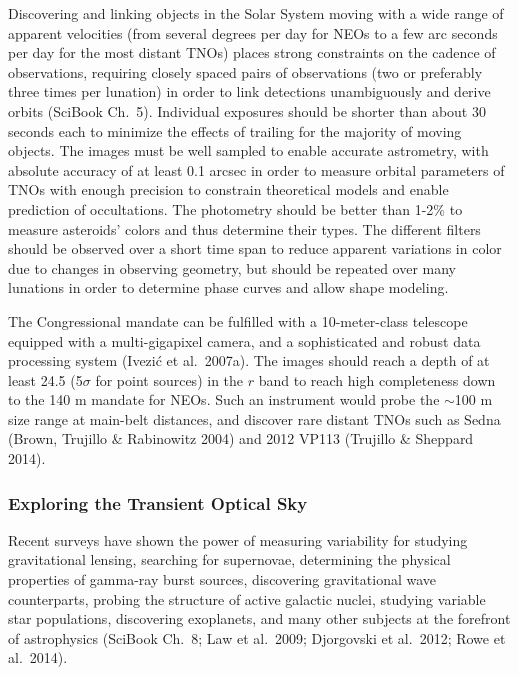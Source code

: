 Discovering and linking objects in the Solar System moving with a wide range of apparent velocities (from
several degrees per day for NEOs to a few arc seconds per day for the most distant TNOs) places strong
constraints on the cadence of observations, requiring closely spaced pairs of observations (two or preferably
three times per lunation) in order to link detections unambiguously and derive orbits (SciBook Ch.~5). Individual
exposures should be shorter than about 30 seconds each to minimize the effects of trailing for the majority of
moving objects. The images must be well sampled to enable accurate astrometry, with absolute accuracy of at
least 0.1 arcsec in order to measure orbital parameters of TNOs with enough precision to constrain theoretical
models and enable prediction of occultations. The photometry should be
better than 1-2\% to measure asteroids' colors and thus determine
their types.  The different filters
should be observed over a short time span to reduce apparent
variations in color due to changes in observing geometry, but should
be repeated over many lunations in order to determine phase curves and allow shape modeling.

The Congressional mandate can be fulfilled with a 10-meter-class
telescope equipped with a multi-gigapixel camera, and a sophisticated
and robust data processing system (Ivezi\'{c} et al.~2007a). The images should reach a depth of at
least 24.5 (5$\sigma$ for point sources) in the $r$ band to reach high
completeness down to the 140 m mandate for NEOs.  Such an instrument
would probe the $\sim$100 m size range at main-belt distances, and
discover rare distant TNOs such as Sedna (Brown, Trujillo \&
Rabinowitz 2004) and 2012 VP113 (Trujillo \& Sheppard 2014).


\subsubsection{ Exploring the Transient Optical Sky}

Recent surveys have shown the power of measuring variability for
studying gravitational lensing, searching for supernovae, determining
the physical properties of gamma-ray burst sources, discovering
gravitational wave counterparts, probing the structure of active
galactic nuclei, studying variable star populations, discovering
exoplanets, and many other subjects at the forefront of astrophysics
(SciBook Ch.~8; Law et al.~2009; Djorgovski et al.~2012; Rowe et
al.~2014).


